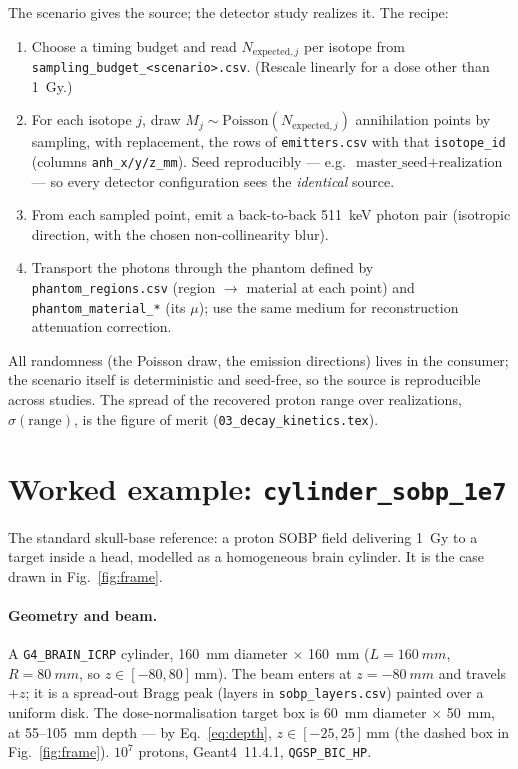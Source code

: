 \documentclass[11pt]{article}
\newcommand{\file}[1]{\texttt{#1}}
\begin{document}
The scenario gives the source; the detector study realizes it. The recipe:
\begin{enumerate}[leftmargin=1.8em]
  \item Choose a timing budget and read $N_{\mathrm{expected},j}$ per isotope
    from \file{sampling\_budget\_<scenario>.csv}. (Rescale linearly for a dose
    other than \SI{1}{Gy}.)
  \item For each isotope $j$, draw $M_j\sim\mathrm{Poisson}(N_{\mathrm{expected},j})$
    annihilation points by sampling, with replacement, the rows of
    \file{emitters.csv} with that \file{isotope\_id} (columns
    \file{anh\_x/y/z\_mm}). Seed reproducibly --- e.g.\
    $\text{master\_seed}+\text{realization}$ --- so every detector configuration
    sees the \emph{identical} source.
  \item From each sampled point, emit a back-to-back \SI{511}{keV} photon pair
    (isotropic direction, with the chosen non-collinearity blur).
  \item Transport the photons through the phantom defined by
    \file{phantom\_regions.csv} (region $\to$ material at each point) and
    \file{phantom\_material\_*} (its $\mu$); use the same medium for
    reconstruction attenuation correction.
\end{enumerate}
All randomness (the Poisson draw, the emission directions) lives in the consumer;
the scenario itself is deterministic and seed-free, so the source is reproducible
across studies. The spread of the recovered proton range over realizations,
$\sigma(\text{range})$, is the figure of merit (\file{03\_decay\_kinetics.tex}).

\section{Worked example: \file{cylinder\_sobp\_1e7}}
\label{sec:example}

The standard skull-base reference: a proton SOBP field delivering \SI{1}{Gy} to
a target inside a head, modelled as a homogeneous brain cylinder. It is the case
drawn in Fig.~\ref{fig:frame}.

\paragraph{Geometry and beam.} A \file{G4\_BRAIN\_ICRP} cylinder,
\SI{160}{mm} diameter $\times$ \SI{160}{mm} ($L=\SI{160}{mm}$, $R=\SI{80}{mm}$,
so $z\in[-80,80]\,$\si{mm}). The beam enters at $z=-\SI{80}{mm}$ and travels
$+z$; it is a spread-out Bragg peak (layers in \file{sobp\_layers.csv}) painted
over a uniform disk. The dose-normalisation target box is
\SI{60}{mm} diameter $\times$ \SI{50}{mm}, at \SI{55}{}--\SI{105}{mm} depth ---
by Eq.~\eqref{eq:depth}, $z\in[-25,25]\,$\si{mm} (the dashed box in
Fig.~\ref{fig:frame}). $10^{7}$ protons, Geant4~11.4.1, \file{QGSP\_BIC\_HP}.
\end{document}
